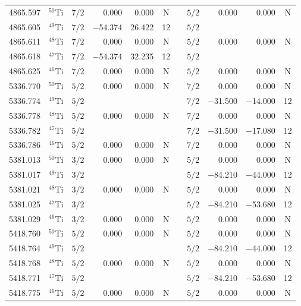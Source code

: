 \documentclass[traditabstract]{aa}
\begin{document}
\begin{center}
\begin{mpsupertabular}{r c@{\hspace{10mm}}c r r ccc r r c}
4865.597 & $^{50}$Ti & $7/2$ &      0.000   &     0.000     &  N && $5/2$  &     0.000&      0.000    &  N \\
4865.605 & $^{49}$Ti & $7/2$ &  $-$54.374   &    26.422     & 12 && $5/2$  &          &               &    \\
4865.611 & $^{48}$Ti & $7/2$ &      0.000   &     0.000     &  N && $5/2$  &     0.000&      0.000    &  N \\
4865.618 & $^{47}$Ti & $7/2$ &  $-$54.374   &    32.235     & 12 && $5/2$  &          &               &    \\
4865.625 & $^{46}$Ti & $7/2$ &      0.000   &     0.000     &  N && $5/2$  &     0.000&      0.000    &  N \\  
5336.770 & $^{50}$Ti & $5/2$ &      0.000   &     0.000     &  N && $7/2$  &     0.000&      0.000    &  N \\
5336.774 & $^{49}$Ti & $5/2$ &              &               &    && $7/2$  & $-$31.500&  $-$14.000    & 12 \\
5336.778 & $^{48}$Ti & $5/2$ &      0.000   &     0.000     &  N && $7/2$  &     0.000&      0.000    &  N \\
5336.782 & $^{47}$Ti & $5/2$ &              &               &    && $7/2$  & $-$31.500&  $-$17.080    & 12 \\
5336.786 & $^{46}$Ti & $5/2$ &      0.000   &     0.000     &  N && $7/2$  &     0.000&      0.000    &  N \\       
5381.013 & $^{50}$Ti & $3/2$ &      0.000   &     0.000     &  N && $5/2$  &     0.000&      0.000    &  N \\
5381.017 & $^{49}$Ti & $3/2$ &              &               &    && $5/2$  & $-$84.210&  $-$44.000    & 12 \\
5381.021 & $^{48}$Ti & $3/2$ &      0.000   &     0.000     &  N && $5/2$  &     0.000&      0.000    &  N \\
5381.025 & $^{47}$Ti & $3/2$ &              &               &    && $5/2$  & $-$84.210&  $-$53.680    & 12 \\
5381.029 & $^{46}$Ti & $3/2$ &      0.000   &     0.000     &  N && $5/2$  &     0.000&      0.000    &  N \\       
5418.760 & $^{50}$Ti & $5/2$ &      0.000   &     0.000     &  N && $5/2$  &     0.000&      0.000    &  N \\
5418.764 & $^{49}$Ti & $5/2$ &              &               &    && $5/2$  & $-$84.210&  $-$44.000    & 12 \\
5418.768 & $^{48}$Ti & $5/2$ &      0.000   &     0.000     &  N && $5/2$  &     0.000&      0.000    &  N \\
5418.771 & $^{47}$Ti & $5/2$ &              &               &    && $5/2$  & $-$84.210&  $-$53.680    & 12 \\
5418.775 & $^{46}$Ti & $5/2$ &      0.000   &     0.000     &  N && $5/2$  &     0.000&      0.000    &  N \\


\end{mpsupertabular}
\end{center}
\end{document}
